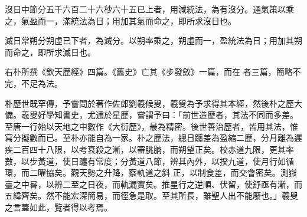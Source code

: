 \begin{pinyinscope}
 沒日中節分五千六百二十六秒六十五已上者，用減統法，為有沒分。通氣策以乘之，氣盈而一，滿統法為日；用加其氣而命之，即所求沒日也。



 滅日常朔分朔虛已下者，為滅分。以朔率乘之，朔虛而一，盈統法為日；用加其朔而命之，即所求滅日也。



 右朴所撰《欽天歷經》四篇。《舊史》亡其《步發斂》一篇，而在
 者三篇，簡略不完，不足為法。



 朴歷世既罕傳，予嘗問於著作佐郎劉羲候叟，羲叟為予求得其本經，然後朴之歷大備。羲叟好學知書史，尤通於星歷，嘗謂予曰：「前世造歷者，其法不同而多差。至唐一行始以天地之中數作《大衍歷》，最為精密。後世善治歷者，皆用其法，惟寫分擬數而已。至朴亦能自為一家。朴之歷法，總日躔差為盈縮二歷，分月離為遲疾二百四十八限，以考衰殺之漸，以審朓朒，而朔望正矣。校赤道九限，更其率數，以步黃道，使日躔有常度；分黃道八節，辨其內外，以揆九道，使月行如循環，而二曜協矣。觀天勢之升降，察軌道之斜
 正，以制食差，而交會密矣。測嶽臺之中晷，以辨二至之日夜，而軌漏實矣。推星行之逆順、伏留，使舒亟有漸，而五緯齊矣。然不能宏深簡易，而徑急是取。至其所長，雖聖人出不能廢也。」羲叟之言蓋如此，覽者得以考焉。



\end{pinyinscope}